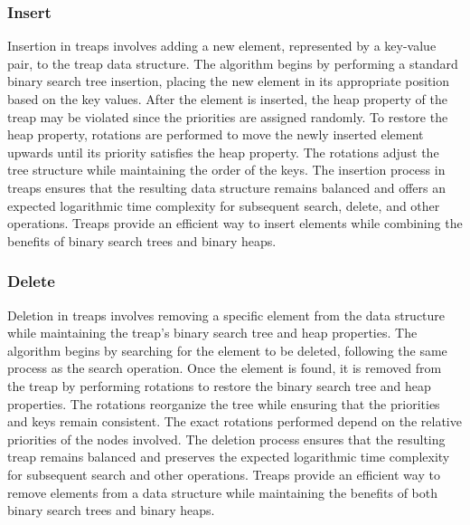 \subsubsection{Insert}

Insertion in treaps involves adding a new element, represented by a key-value pair, to the treap data structure. The algorithm begins by performing a standard binary search tree insertion, placing the new 
element in its appropriate position based on the key values. After the element is inserted, the heap property of the treap may be violated since the priorities are assigned randomly. To restore the heap 
property, rotations are performed to move the newly inserted element upwards until its priority satisfies the heap property. The rotations adjust the tree structure while maintaining the order of the keys. 
The insertion process in treaps ensures that the resulting data structure remains balanced and offers an expected logarithmic time complexity for subsequent search, delete, and other operations. Treaps provide 
an efficient way to insert elements while combining the benefits of binary search trees and binary heaps.

\subsubsection{Delete}

Deletion in treaps involves removing a specific element from the data structure while maintaining the treap's binary search tree and heap properties. The algorithm begins by searching for the element to 
be deleted, following the same process as the search operation. Once the element is found, it is removed from the treap by performing rotations to restore the binary search tree and heap properties. The 
rotations reorganize the tree while ensuring that the priorities and keys remain consistent. The exact rotations performed depend on the relative priorities of the nodes involved. The deletion process 
ensures that the resulting treap remains balanced and preserves the expected logarithmic time complexity for subsequent search and other operations. Treaps provide an efficient way to remove elements from 
a data structure while maintaining the benefits of both binary search trees and binary heaps.